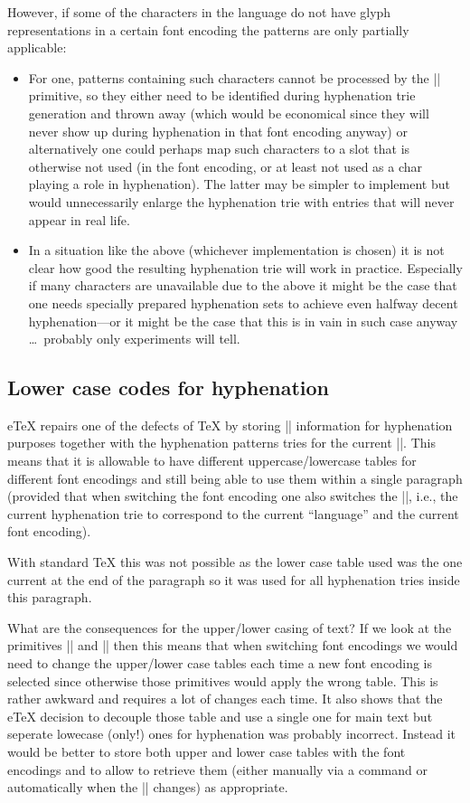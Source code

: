 \documentclass{ltxdoc}
\begin{document}
However, if some of the characters in the language do not have glyph
representations in a certain font encoding the patterns are only
partially applicable:
\begin{itemize}
\item For one, patterns containing such characters cannot be processed
  by the |\pattern| primitive, so they either need to be identified
  during hyphenation trie generation and thrown away (which would be
  economical since they will never show up during hyphenation in that
  font encoding anyway) or alternatively one could perhaps map such
  characters to a slot that is otherwise not used (in the font
  encoding, or at least not used as a char playing a role in
  hyphenation). The latter may be simpler to implement but would
  unnecessarily enlarge the hyphenation trie with entries that will
  never appear in real life.
\item In a situation like the above (whichever implementation is
  chosen) it is not clear how good the resulting hyphenation trie will
  work in practice. Especially if many characters are unavailable due
  to the above it might be the case that one needs specially prepared
  hyphenation sets to achieve even halfway decent hyphenation---or it
  might be the case that this is in vain in such case anyway \ldots\
  probably only experiments will tell.
\end{itemize}



\subsection{Lower case codes for hyphenation}

e\TeX{} repairs one of the defects of \TeX{} by storing |\lccode|
information for hyphenation purposes together with the hyphenation
patterns tries for the current |\language|. This means that it is
allowable to have different uppercase/lowercase tables for different
font encodings and still being able to use them within a single
paragraph (provided that when switching the font encoding one also
switches the |\language|, i.e., the current hyphenation trie to
correspond to the current ``language'' and the current font encoding).

With standard \TeX{} this was not possible as the lower case table
used was the one current at the end of the paragraph so it was used
for all hyphenation tries inside this paragraph.

What are the consequences for the upper/lower casing of text? If we
look at the primitives |\uppercase| and |\lowercase| then this means
that when switching font encodings we would need to change the
upper/lower case tables each time a new font encoding is selected
since otherwise those primitives would apply the wrong table. This is
rather awkward and requires a lot of changes each time. It also shows
that the e\TeX{} decision to decouple those table and use a single one
for main text but seperate lowecase (only!) ones for hyphenation was
probably incorrect. Instead it would be better to store both upper and
lower case tables with the font encodings and to allow to retrieve
them (either manually via a command or automatically when the
|\language| changes) as appropriate.
\end{document}

